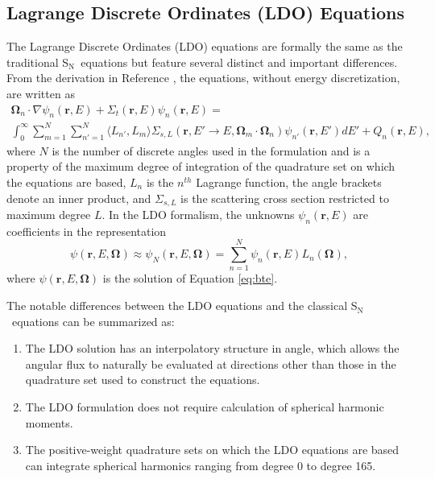 \documentclass{article} %
\newcommand{\bo}{\mathbf\Omega}
\newcommand{\vecr}{\textbf{r}}
\newcommand{\sn}{S$_\mathrm{N}$}
\begin{document}
\subsection{Lagrange Discrete Ordinates (LDO) Equations}

The Lagrange Discrete Ordinates (LDO) equations are formally the same as the
traditional \sn\ equations but feature several distinct and important
differences. From the derivation in Reference \cite{ahrens}, the equations,
without energy discretization, are written as
%
\begin{multline}
\bo_n\cdot\nabla\psi_{n}(\vecr,E) + 
\Sigma_{t}(\vecr,E)\psi_{n}(\vecr,E) = \\
\int_0^\infty\sum_{m=1}^{N}\sum_{n'=1}^{N}\langle L_{n'},L_{m}\rangle
\Sigma_{s,L}(\vecr,E'\rightarrow E,\bo_{m}\cdot\bo_n)\psi_{n'}(\vecr,E')dE'
+ Q_{n}(\vecr,E),
\end{multline}
%
where $N$ is the number of discrete angles used in the formulation
and is a property of the maximum degree of integration of the quadrature set
on which the equations are based, $L_n$ is the $n^{th}$ Lagrange function, the
angle brackets denote an inner product, and
$\Sigma_{s,L}$ is the scattering cross section restricted to maximum degree
$L$. In the LDO formalism, the unknowns $\psi_{n}(\vecr,E)$ are coefficients in 
the representation
%
\begin{equation}
\psi(\vecr,E,\bo) \approx \psi_N(\vecr,E,\bo) =
\sum_{n=1}^{N}\psi_{n}(\vecr,E) L_n\left(\bo\right),
\end{equation}
%
where $\psi(\vecr,E,\bo)$ is the solution of Equation \eqref{eq:bte}.

The notable differences between the LDO equations and the classical \sn\
equations can be summarized as:

\begin{enumerate}
\item{The LDO solution has an interpolatory structure in angle, which allows
      the angular flux to naturally be evaluated at directions other than those
      in the quadrature set used to construct the equations.}
\item{The LDO formulation does not require calculation of spherical harmonic
      moments.}
\item{The positive-weight quadrature sets on which the LDO equations are based
      can integrate spherical harmonics ranging from degree 0 to degree 165.}
\end{enumerate}
\end{document}
